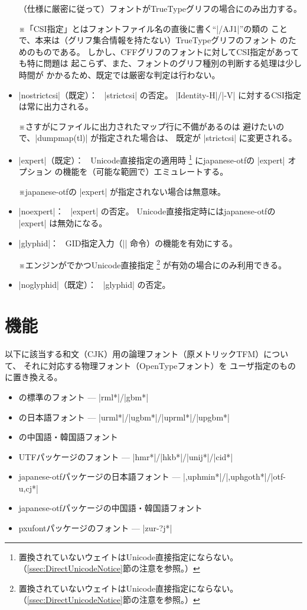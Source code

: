 \documentclass[uplatex,dvipdfmx,a4paper]{jsarticle}
\newcommand{\Pkg}[1]{\textsf{#1}}
\newcommand{\Note}{\par\noindent ※}
\newcommand{\Means}{：\ }
\begin{document}
\begin{itemize}
  （仕様に厳密に従って）フォントがTrueTypeグリフの場合にのみ出力する。
  \Note 「CSI指定」とはフォントファイル名の直後に書く“|/AJ1|”の類の
    ことで、本来は（グリフ集合情報を持たない）TrueTypeグリフのフォント
    のためのものである。
    しかし、CFFグリフのフォントに対してCSI指定があっても特に問題は
    起こらず、また、フォントのグリフ種別の判断する処理は少し時間が
    かかるため、既定では厳密な判定は行わない。
\item |nostrictcsi|（既定）\Means
  |strictcsi| の否定。
  |Identity-H|/|-V| に対するCSI指定は常に出力される。
  \Note さすがにファイルに出力されたマップ行に不備があるのは
    避けたいので、|dumpmap(tl)| が指定された場合は、
    既定が |strictcsi| に変更される。
\item |expert|（既定）\Means
  Unicode直接指定の適用時
  \footnote{置換されていないウェイトはUnicode直接指定にならない。
    （\ref{ssec:DirectUnicodeNotice}節の注意を参照。）}%
  に\Pkg{japanese-otf}の |expert| オプション
  の機能を（可能な範囲で）エミュレートする。
  \Note \Pkg{japanese-otf}の |expert| が指定されない場合は無意味。
\item |noexpert|\Means
  |expert| の否定。
  Unicode直接指定時には\Pkg{japanese-otf}の |expert| は無効になる。
\item |glyphid|\Means
  GID指定入力（|\gid| 命令）の機能を有効にする。
  \Note エンジンが{\upTeX}でかつUnicode直接指定
  \footnote{置換されていないウェイトはUnicode直接指定にならない。
    （\ref{ssec:DirectUnicodeNotice}節の注意を参照。）}%
  が有効の場合にのみ利用できる。
\item |noglyphid|（既定）\Means
  |glyphid| の否定。
\end{itemize}

\section{機能}

以下に該当する和文（CJK）用の論理フォント（原メトリックTFM）について、
それに対応する物理フォント（OpenTypeフォント）を
ユーザ指定のものに置き換える。
\begin{itemize}
\item {\pTeX}の標準のフォント --- |rml*|/|gbm*|
\item {\upTeX}の日本語フォント --- |urml*|/|ugbm*|/|uprml*|/|upgbm*|
\item {\upTeX}の中国語・韓国語フォント
\item \Pkg{UTF}パッケージのフォント --- |hmr*|/|hkb*|/|unij*|/|cid*|
\item \Pkg{japanese-otf}パッケージの日本語フォント
  --- |{,up}hmin*|/|{,up}hgoth*|/|otf-{u,c}j*|
\item \Pkg{japanese-otf}パッケージの中国語・韓国語フォント
\item \Pkg{pxufont}パッケージのフォント
  --- |zur-?j*|
\end{itemize}
\end{document}
